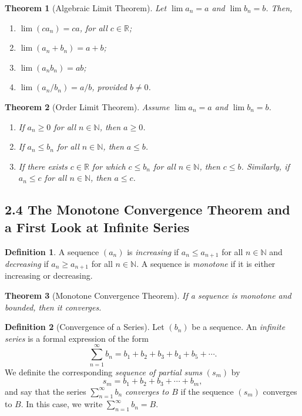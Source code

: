 \documentclass{amsart}
\newtheorem*{theorem}{Theorem}
\theoremstyle{definition}
\newtheorem*{definition}{Definition}
\newcommand{\N}{\mathbb{N}}
\newcommand{\R}{\mathbb{R}}
\begin{document}
\begin{theorem}[Algebraic Limit Theorem]
  Let $\lim{a_n} = a$ and $\lim{b_n} = b$. Then,
  \begin{enumerate}[label={(\roman*)}]
    \item $\lim(ca_n) = ca$, for all $c \in \R$;
    \item $\lim(a_n + b_n) = a + b$;
    \item $\lim(a_n b_n) = ab$;
    \item $\lim(a_n / b_n) = a / b$, provided $b \neq 0$.
  \end{enumerate}
\end{theorem}

\begin{theorem}[Order Limit Theorem]
  Assume $\lim{a_n} = a$ and $\lim{b_n} = b$.
  \begin{enumerate}[label={(\roman*)}]
    \item If $a_n \ge 0$ for all $n \in \N$, then $a \ge 0$.
    \item If $a_n \le b_n$ for all $n \in \N$, then $a \le b$.
    \item If there exists $c \in \R$ for which $c \le b_n$ for all $n \in \N$,
      then $c \le b$. Similarly, if $a_n \le c$ for all $n \in \N$, then $a \le
      c$.
  \end{enumerate}
\end{theorem}

\subsection*{2.4 The Monotone Convergence Theorem and a First Look at Infinite
Series}

\begin{definition}
  A sequence $(a_n)$ is \emph{increasing} if $a_n \le a_{n+1}$ for all $n \in
  \N$ and \emph{decreasing} if $a_n \ge a_{n+1}$ for all $n \in \N$. A sequence
  is \emph{monotone} if it is either increasing or decreasing.
\end{definition}

\begin{theorem}[Monotone Convergence Theorem]
  If a sequence is monotone and bounded, then it converges.
\end{theorem}

\begin{definition}[Convergence of a Series]
  Let $(b_n)$ be a sequence. An \emph{infinite series} is a formal expression of
  the form
  \[
    \sum_{n=1}^{\infty} b_n = b_1 + b_2 + b_3 + b_4 + b_5 + \cdots.
  \]
  We definite the corresponding \emph{sequence of partial sums} $(s_m)$ by
  \[
    s_m = b_1 + b_2 + b_3 + \cdots + b_m,
  \]
  and say that the series $\sum_{n=1}^{\infty} b_n$ \emph{converges to $B$} if
  the sequence $(s_m)$ converges to $B$. In this case, we write
  $\sum_{n=1}^{\infty} b_n = B$.
\end{definition}
\end{document}
